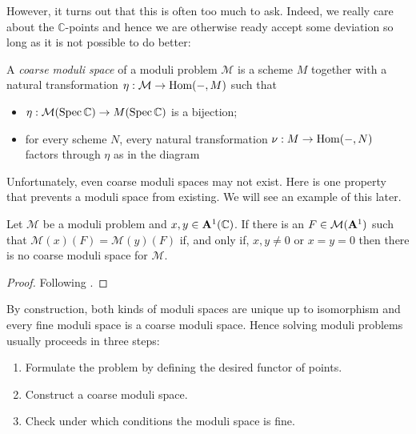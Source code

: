 \documentclass[12pt]{ociamthesis}  %
\begin{document}
\begin{example}
  \missingexample
\end{example}

However, it turns out that this is often too much to ask. Indeed,
we really care about the $\mathbb{C}$-points and hence
we are otherwise ready accept some deviation so long as it is not
possible to do better:

\begin{definition}\missingcitation
  A \emph{coarse moduli space} of a moduli problem $\mathcal M$
  is a scheme $M$ together with a natural transformation
  $\eta : \mathcal M \to \operatorname{Hom}(-,M)$ such that
  \begin{itemize}
    \item $\eta : \mathcal M(\operatorname{Spec}\mathbb{C})\to M(\operatorname{Spec}\mathbb{C})$ is a bijection;
    \item for every scheme $N$, every natural transformation
          $\nu : M \to \operatorname{Hom}(-,N)$ factors through $\eta$ as in the diagram
  \end{itemize}
\end{definition}

\begin{example}
  \missingexample
\end{example}

Unfortunately, even coarse moduli spaces may not exist. Here is
one property that prevents a moduli space from existing. We will
see an example of this later. 

\begin{lemma}\label{lem:no_coarse_condition}
  Let $\mathcal M$ be a moduli problem and
  $x,y\in \mathbf{A}^{1}_{}(\mathbb{C})$. If there is an
  $F\in\mathcal M(\mathbf{A}^{1}_{})$ such that
  $\mathcal M(x)(F) = \mathcal M(y)(F)$ if, and only if,
  $x,y\neq 0$ or $x=y=0$ then there is no coarse moduli space
  for $\mathcal M$.
  \begin{proof}
    Following \cite[Lemma 2.27]{hoskins2016}.
    \missingproof
  \end{proof}
\end{lemma}

By construction, both kinds of moduli spaces are unique up to
isomorphism and every fine moduli space is a coarse moduli
space. Hence solving moduli problems usually proceeds in
three steps:

\begin{enumerate}
  \item Formulate the problem by defining the desired functor of
        points.
  \item Construct a coarse moduli space.
  \item Check under which conditions the moduli space is fine.
\end{enumerate}
\end{document}
